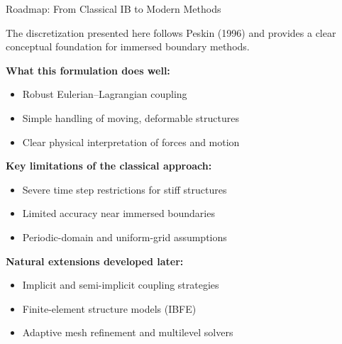 \documentclass{beamer}
\begin{document}
\begin{frame}{Roadmap: From Classical IB to Modern Methods}
\small

The discretization presented here follows Peskin (1996) and provides a
clear conceptual foundation for immersed boundary methods.

\medskip
\textbf{What this formulation does well:}
\begin{itemize}
    \item Robust Eulerian–Lagrangian coupling
    \item Simple handling of moving, deformable structures
    \item Clear physical interpretation of forces and motion
\end{itemize}

\medskip
\textbf{Key limitations of the classical approach:}
\begin{itemize}
    \item Severe time step restrictions for stiff structures
    \item Limited accuracy near immersed boundaries
    \item Periodic-domain and uniform-grid assumptions
\end{itemize}

\medskip
\textbf{Natural extensions developed later:}
\begin{itemize}
    \item Implicit and semi-implicit coupling strategies
    \item Finite-element structure models (IBFE)
    \item Adaptive mesh refinement and multilevel solvers
\end{itemize}

\end{frame}
\end{document}
